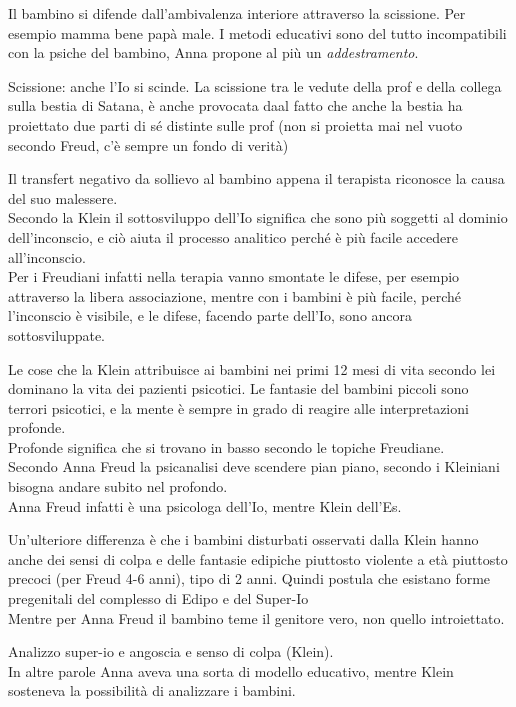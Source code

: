 \documentclass[
]{article}
\begin{document}
Il bambino si difende dall'ambivalenza interiore attraverso la
scissione. Per esempio mamma bene papà male. I metodi educativi sono del
tutto incompatibili con la psiche del bambino, Anna propone al più un
\emph{addestramento}.

Scissione: anche l'Io si scinde. La scissione tra le vedute della prof e
della collega sulla bestia di Satana, è anche provocata daal fatto che
anche la bestia ha proiettato due parti di sé distinte sulle prof (non
si proietta mai nel vuoto secondo Freud, c'è sempre un fondo di verità)

Il transfert negativo da sollievo al bambino appena il terapista
riconosce la causa del suo malessere.\\
Secondo la Klein il sottosviluppo dell'Io significa che sono più
soggetti al dominio dell'inconscio, e ciò aiuta il processo analitico
perché è più facile accedere all'inconscio.\\
Per i Freudiani infatti nella terapia vanno smontate le difese, per
esempio attraverso la libera associazione, mentre con i bambini è più
facile, perché l'inconscio è visibile, e le difese, facendo parte
dell'Io, sono ancora sottosviluppate.

Le cose che la Klein attribuisce ai bambini nei primi 12 mesi di vita
secondo lei dominano la vita dei pazienti psicotici. Le fantasie del
bambini piccoli sono terrori psicotici, e la mente è sempre in grado di
reagire alle interpretazioni profonde.\\
Profonde significa che si trovano in basso secondo le topiche
Freudiane.\\
Secondo Anna Freud la psicanalisi deve scendere pian piano, secondo i
Kleiniani bisogna andare subito nel profondo.\\
Anna Freud infatti è una psicologa dell'Io, mentre Klein dell'Es.

Un'ulteriore differenza è che i bambini disturbati osservati dalla Klein
hanno anche dei sensi di colpa e delle fantasie edipiche piuttosto
violente a età piuttosto precoci (per Freud 4-6 anni), tipo di 2 anni.
Quindi postula che esistano forme pregenitali del complesso di Edipo e
del Super-Io\\
Mentre per Anna Freud il bambino teme il genitore vero, non quello
introiettato.

Analizzo super-io e angoscia e senso di colpa (Klein).\\
In altre parole Anna aveva una sorta di modello educativo, mentre Klein
sosteneva la possibilità di analizzare i bambini.
\end{document}
